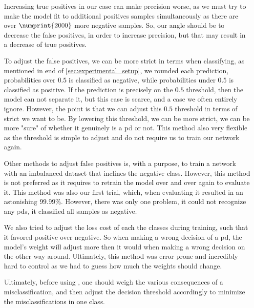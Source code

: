 Increasing true positives in our case can make precision worse, as we must try to make the model fit to additional positives samples simultaneously as there are over $\numprint{2000}$ more negative samples. So, our angle should be to decrease the false positives, in order to increase precision, but that may result in a decrease of true positives. 

To adjust the false positives, we can be more strict in terms when classifying, as mentioned in end of \autoref{sec:experimental_setup}, we rounded each prediction, probabilities over $0.5$ is classified as negative, while probabilities under $0.5$ is classified as positive. If the prediction is precisely on the $0.5$ threshold, then the model can not separate it, but this case is scarce, and a case we often entirely ignore. However, the point is that we can adjust this $0.5$ threshold in terms of strict we want to be. By lowering this threshold, we can be more strict, we can be more "sure" of whether it genuinely is a \ac{pd} or not. This method also very flexible as the threshold is simple to adjust and do not require us to train our network again.

Other methods to adjust false positives is, with a purpose, to train a network with an imbalanced dataset that inclines the negative class. However, this method is not preferred as it requires to retrain the model over and over again to evaluate it. This method was also our first trial, which, when evaluating it resulted in an astonishing $99.99\%$. However, there was only one problem, it could not recognize any \acp{pd}, it classified all samples as negative.

We also tried to adjust the loss cost of each the classes during training, such that it favored positive over negative. So when making a wrong decision of a \ac{pd}, the model's weight will adjust more then it would when making a wrong decision on the other way around. Ultimately, this method was error-prone and incredibly hard to control as we had to guess how much the weights should change.

Ultimately, before using \project, one should weigh the various consequences of a misclassification, and then adjust the decision threshold accordingly to minimize the misclassifications in one class.